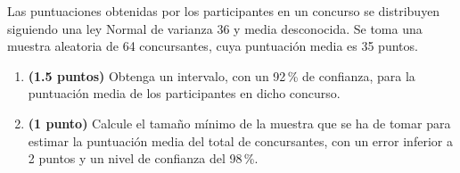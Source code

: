 
Las puntuaciones obtenidas por los participantes en un concurso se distribuyen
siguiendo una ley Normal de varianza 36 y media desconocida. Se toma una
muestra aleatoria de 64 concursantes, cuya puntuación media es 35 puntos.

\begin{enumerate}[label=\alph*)]
  \item \textbf{(1.5 puntos)} Obtenga un intervalo, con un 92\,\% de confianza,
  para la puntuación media de los participantes en dicho concurso.
  \item \textbf{(1 punto)} Calcule el tamaño mínimo de la muestra que se ha
  de tomar para estimar la puntuación media del total de concursantes, con
  un error inferior a 2 puntos y un nivel de confianza del 98\,\%.
\end{enumerate}
